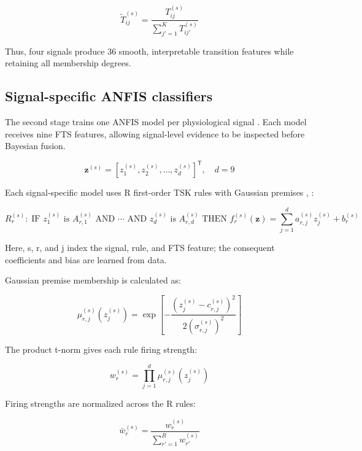 \documentclass[runningheads]{llncs}
\begin{document}
\begin{equation}\widetilde{T}_{ij}^{(s)}=\frac{T_{ij}^{(s)}}{\sum_{j\prime=1}^{K}T_{ij\prime}^{(s)}}\tag{6}\end{equation}

Thus, four signals produce 36 smooth, interpretable transition features while retaining all membership degrees.

\subsection{Signal-specific ANFIS classifiers}

The second stage trains one ANFIS model per physiological signal \cite{ref7}. Each model receives nine FTS features, allowing signal-level evidence to be inspected before Bayesian fusion.

\begin{equation*}\mathbf{z}^{(s)}=[z_1^{(s)},z_2^{(s)},\ldots,z_d^{(s)}]^{\mathsf T},\quad d=9\end{equation*}

Each signal-specific model uses R first-order TSK rules with Gaussian premises \cite{ref7}, \cite{ref19}:

\begin{equation}R_r^{(s)}:\;\text{IF }z_1^{(s)}\text{ is }A_{r,1}^{(s)}\text{ AND }\cdots\text{ AND }z_d^{(s)}\text{ is }A_{r,d}^{(s)}\text{ THEN }f_r^{(s)}(\mathbf z)=\sum_{j=1}^{d}a_{r,j}^{(s)}z_j^{(s)}+b_r^{(s)}\tag{7}\end{equation}

Here, s, r, and j index the signal, rule, and FTS feature; the consequent coefficients and bias are learned from data.

Gaussian premise membership is calculated as:

\begin{equation}\mu_{r,j}^{(s)}(z_j^{(s)})=\exp\!\left[-\frac{(z_j^{(s)}-c_{r,j}^{(s)})^2}{2(\sigma_{r,j}^{(s)})^2}\right]\tag{8}\end{equation}

The product t-norm gives each rule firing strength:

\begin{equation}w_r^{(s)}=\prod_{j=1}^{d}\mu_{r,j}^{(s)}(z_j^{(s)})\tag{9}\end{equation}

Firing strengths are normalized across the R rules:

\begin{equation}\bar{w}_r^{(s)}=\frac{w_r^{(s)}}{\sum_{r\prime=1}^{R}w_{r\prime}^{(s)}}\tag{10}\end{equation}
\end{document}

